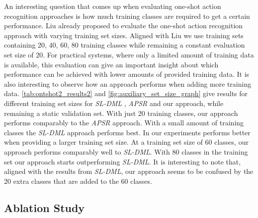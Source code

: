 An interesting question that comes up when evaluating one-shot action recognition approaches is how much training classes are required to get a certain performance. 
Liu \andothers \cite{liu2019ntu} already proposed to evaluate the one-shot action recognition approach with varying training set sizes. Aligned with Liu \andothers \cite{liu2019ntu} we use training sets containing 20, 40, 60, 80 training classes while remaining a constant evaluation set size of 20. For practical systems, where only a limited amount of training data is available, this evaluation can give an important insight about which performance can be achieved with lower amounts of provided training data. It is also interesting to observe how an approach performs when adding more training data. \tabname \ref{tab:ontshot2_results2} and \figname \ref{fig:auxiliary_set_size_graph} give results for different training set sizes for \textit{SL-DML} \cite{memmesheimer2020signal}, \textit{APSR} \cite{liu2019ntu} and our \approachname{} approach, while remaining a static validation set. With just 20 training classes, our approach performs comparably to the \textit{APSR} approach. With a small amount of training classes the \textit{SL-DML} approach performs best. In our experiments \approachname{} performs better when providing a larger training set size. At a training set size of 60 classes, our approach performs comparably well to \textit{SL-DML}. With 80 classes in the training set our approach starts outperforming \textit{SL-DML}. It is interesting to note that, aligned with the results from \textit{SL-DML}, our approach seems to be confused by the 20 extra classes that are added to the 60 classes. 

\subsection{Ablation Study}
\label{ssec:ablation_study}

